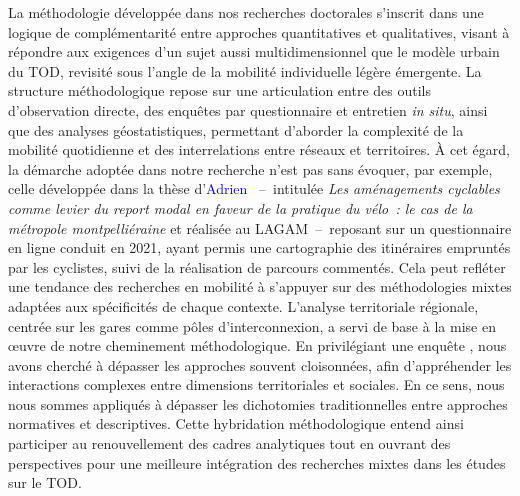 \begin{refsegment}
La méthodologie développée dans nos recherches doctorales s’inscrit dans une logique de complémentarité entre approches quantitatives et qualitatives, visant à répondre aux exigences d’un sujet aussi multidimensionnel que le modèle urbain du \acrshort{TOD}, revisité sous l’angle de la mobilité individuelle légère émergente. La structure méthodologique repose sur une articulation entre des outils d’observation directe, des enquêtes par questionnaire et entretien \textsl{in situ}, ainsi que des analyses géostatistiques, permettant d’aborder la complexité de la mobilité quotidienne et des interrelations entre réseaux et territoires. À cet égard, la démarche adoptée dans notre recherche n’est pas sans évoquer, par exemple, celle développée dans la thèse d'\textcolor{blue}{Adrien} \textcolor{blue}{\textcite{poisson_amenagements_2019}}~–~intitulée \textsl{Les aménagements cyclables comme levier du report modal en faveur de la pratique du vélo~: le cas de la métropole montpelliéraine} et réalisée au \acrfull{LAGAM}~–~reposant sur un questionnaire en ligne conduit en 2021, ayant permis une cartographie des itinéraires empruntés par les cyclistes, suivi de la réalisation de parcours commentés. Cela peut refléter une tendance des recherches en mobilité à s’appuyer sur des méthodologies mixtes adaptées aux spécificités de chaque contexte. L’analyse territoriale régionale, centrée sur les gares comme pôles d’interconnexion, a servi de base à la mise en œuvre de notre cheminement méthodologique. En privilégiant une enquête , nous avons cherché à dépasser les approches  souvent cloisonnées, afin d’appréhender les interactions complexes entre dimensions territoriales et sociales. En ce sens, nous nous sommes appliqués à dépasser les dichotomies traditionnelles entre approches normatives et descriptives. Cette hybridation méthodologique entend ainsi participer au renouvellement des cadres analytiques tout en ouvrant des perspectives pour une meilleure intégration des recherches mixtes dans les études sur le \acrshort{TOD}.%


\end{refsegment}
